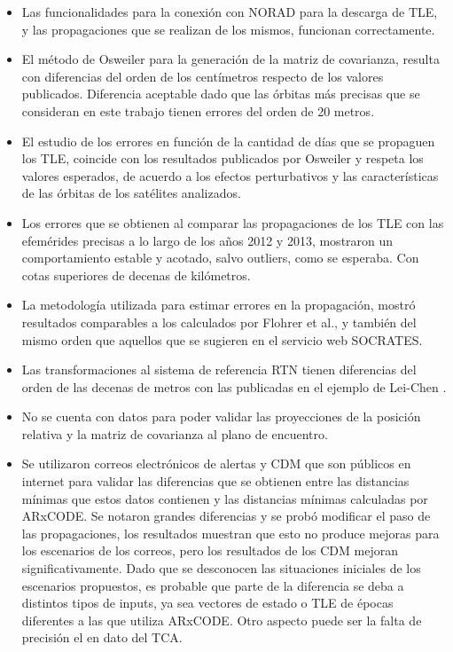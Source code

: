  \begin{itemize}
  \item Las funcionalidades para la conexi\'on con NORAD para la descarga de TLE, y las propagaciones que se realizan de los mismos, funcionan correctamente.\\
  \item El m\'etodo de Osweiler \citep{osweiler} para la generaci\'on de la matriz de covarianza, resulta con diferencias del orden de los cent\'imetros respecto de los valores publicados. Diferencia  aceptable dado que las \'orbitas m\'as precisas que se consideran en este trabajo tienen errores del orden de 20 metros.\\
  \item El estudio de los errores en funci\'on de la cantidad de d\'ias que se propaguen los TLE, coincide con los resultados publicados por Osweiler \citep{osweiler} y respeta los valores esperados, de acuerdo a los efectos perturbativos y las caracter\'isticas de las \'orbitas de los sat\'elites analizados.\\
  \item Los errores que se obtienen al comparar las propagaciones de los TLE con las efem\'erides precisas a lo largo de los a\~nos 2012 y 2013, mostraron un comportamiento estable y acotado, salvo outliers, como se esperaba. Con cotas superiores de decenas de kil\'ometros.\\
  \item La metodolog\'ia utilizada para estimar errores en la propagaci\'on, mostr\'o resultados comparables a los calculados por Flohrer et al., \citep{flohrer2008assessment} y tambi\'en del mismo orden que aquellos que se sugieren en el servicio web SOCRATES.
  \item Las transformaciones al sistema de referencia RTN tienen diferencias del orden de las decenas de metros con las publicadas en el ejemplo de Lei-Chen \citep{leichen}.\\
  \item No se cuenta con datos para poder validar las proyecciones de la posici\'on relativa y la matriz de covarianza al plano de encuentro.\\
  \item Se utilizaron correos electr\'onicos de alertas y CDM que son p\'ublicos en internet para validar las diferencias que se obtienen entre las distancias m\'inimas que estos datos contienen y las distancias m\'inimas calculadas por ARxCODE. Se notaron grandes diferencias y se prob\'o modificar el paso de las propagaciones, los resultados muestran que esto no produce mejoras para los escenarios de los correos, pero los resultados de los CDM mejoran significativamente. Dado que se desconocen las situaciones iniciales de los escenarios propuestos, es probable que parte de la diferencia se deba a distintos tipos de inputs, ya sea vectores de estado o TLE de \'epocas  diferentes a las que utiliza ARxCODE. Otro aspecto puede ser la falta de precisi\'on el en dato del TCA.\\

\end{itemize}
